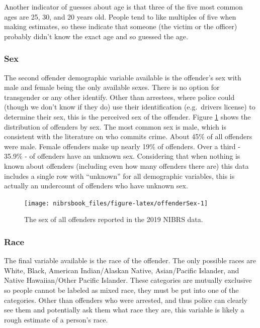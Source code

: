 \documentclass[
  12pt,
  openany]{book}
\begin{document}
Another indicator of guesses about age is that three of the five most common ages are 25, 30, and 20 years old. People tend to like multiples of five when making estimates, so these indicate that someone (the victim or the officer) probably didn't know the exact age and so guessed the age.

\hypertarget{sex}{%
\subsubsection{Sex}\label{sex}}

The second offender demographic variable available is the offender's sex with male and female being the only available sexes. There is no option for transgender or any other identify. Other than arrestees, where police could (though we don't know if they do) use their identification (e.g.~drivers license) to determine their sex, this is the perceived sex of the offender. Figure \ref{fig:offenderSex} shows the distribution of offenders by sex. The most common sex is male, which is consistent with the literature on who commits crime. About 45\% of all offenders were male. Female offenders make up nearly 19\% of offenders. Over a third - 35.9\% - of offenders have an unknown sex. Considering that when nothing is known about offenders (including even how many offenders there are) this data includes a single row with ``unknown'' for all demographic variables, this is actually an undercount of offenders who have unknown sex.

\begin{figure}

{\centering \texttt{[image: nibrsbook\_files/figure-latex/offenderSex-1]} 

}

\caption{The sex of all offenders reported in the 2019 NIBRS data.}\label{fig:offenderSex}
\end{figure}

\hypertarget{race}{%
\subsubsection{Race}\label{race}}

The final variable available is the race of the offender. The only possible races are White, Black, American Indian/Alaskan Native, Asian/Pacific Islander, and Native Hawaiian/Other Pacific Islander. These categories are mutually exclusive so people cannot be labeled as mixed race, they must be put into one of the categories. Other than offenders who were arrested, and thus police can clearly see them and potentially ask them what race they are, this variable is likely a rough estimate of a person's race.
\end{document}
